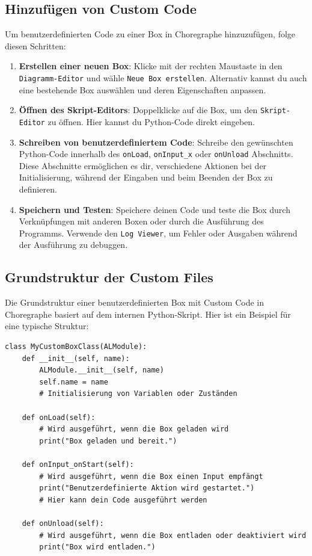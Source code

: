 \subsection{Hinzufügen von Custom Code}
Um benutzerdefinierten Code zu einer Box in Choregraphe hinzuzufügen, folge diesen Schritten:
\begin{enumerate}
    \item \textbf{Erstellen einer neuen Box}: Klicke mit der rechten Maustaste in den \texttt{Diagramm-Editor} und wähle \texttt{Neue Box erstellen}. Alternativ kannst du auch eine bestehende Box auswählen und deren Eigenschaften anpassen.
    \item \textbf{Öffnen des Skript-Editors}: Doppelklicke auf die Box, um den \texttt{Skript-Editor} zu öffnen. Hier kannst du Python-Code direkt eingeben.
    \item \textbf{Schreiben von benutzerdefiniertem Code}: Schreibe den gewünschten Python-Code innerhalb des \texttt{onLoad}, \texttt{onInput\_x} oder \texttt{onUnload} Abschnitts. Diese Abschnitte ermöglichen es dir, verschiedene Aktionen bei der Initialisierung, während der Eingaben und beim Beenden der Box zu definieren.
    \item \textbf{Speichern und Testen}: Speichere deinen Code und teste die Box durch Verknüpfungen mit anderen Boxen oder durch die Ausführung des Programms. Verwende den \texttt{Log Viewer}, um Fehler oder Ausgaben während der Ausführung zu debuggen.
\end{enumerate}

\subsection{Grundstruktur der Custom Files}
Die Grundstruktur einer benutzerdefinierten Box mit Custom Code in Choregraphe basiert auf dem internen Python-Skript. Hier ist ein Beispiel für eine typische Struktur:
\begin{verbatim}
class MyCustomBoxClass(ALModule):
    def __init__(self, name):
        ALModule.__init__(self, name)
        self.name = name
        # Initialisierung von Variablen oder Zuständen

    def onLoad(self):
        # Wird ausgeführt, wenn die Box geladen wird
        print("Box geladen und bereit.")

    def onInput_onStart(self):
        # Wird ausgeführt, wenn die Box einen Input empfängt
        print("Benutzerdefinierte Aktion wird gestartet.")
        # Hier kann dein Code ausgeführt werden

    def onUnload(self):
        # Wird ausgeführt, wenn die Box entladen oder deaktiviert wird
        print("Box wird entladen.")
\end{verbatim}

